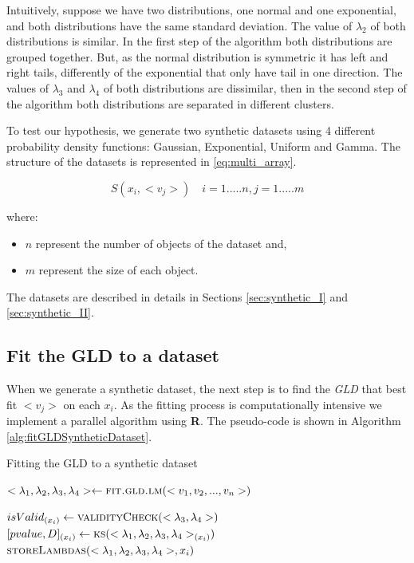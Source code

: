 Intuitively, suppose we have two distributions, one normal and one exponential, and both distributions have the same standard deviation. The value of $\lambda_{2}$ of both distributions is similar. In the first step of the algorithm both distributions are grouped together. But, as the normal distribution is symmetric it has left and right tails, differently of the exponential that only have tail in one direction. The values of $\lambda_{3}$ and $\lambda_{4}$ of both distributions are dissimilar, then in the second step of the algorithm both distributions are separated in different clusters.   

To test our hypothesis, we generate two synthetic datasets using 4 different probability density functions: Gaussian, Exponential, Uniform and Gamma. The structure of the datasets is represented in \ref{eq:multi_array}.  

\begin{equation}\label{eq:multi_array}
S(x_{i}, <v_{j}>) \quad i=1.....n,j=1.....m
\end{equation}

where:
\begin{itemize}
\item $n$ represent the number of objects of the dataset and,
\item $m$ represent the size of each object.
\end{itemize}

The datasets are described in details in Sections \ref{sec:synthetic_I} and \ref{sec:synthetic_II}. 


\subsection{Fit the GLD to a dataset}\label{sub:fitting_gld}
When we generate a synthetic dataset, the next step is to find the \textit{GLD} that best fit $<v_{j}>$ on each $x_{i}$. As the fitting process is computationally intensive we implement a parallel algorithm using \textbf{R}. The pseudo-code is shown in Algorithm \ref{alg:fitGLDSyntheticDataset}.

\begin{algorithm} 
\caption{Fitting the GLD to a synthetic dataset}\label{alg:fitGLDSyntheticDataset}
\begin{algorithmic}[1] 
\State $<\lambda_{1},\lambda_{2},\lambda_{3},\lambda_{4}> \gets \Call {fit.gld.lm}{<v_1,v_2,...,v_{n}>}$

\State $isValid_{(x_{i})} \gets \Call {validityCheck}{<\lambda_{3},\lambda_{4}>}$
\State $[pvalue,D]_{(x_{i})} \gets \Call{ks}{<\lambda_{1},\lambda_{2},\lambda_{3},\lambda_{4}>_{(x_{i})}}$
\EndIf
{}
\State $\Call{storeLambdas}{<\lambda_{1},\lambda_{2},\lambda_{3},\lambda_{4}>,x_{i}}$
\EndIf
\EndFunction 
\end{algorithmic} 
\end{algorithm} 

